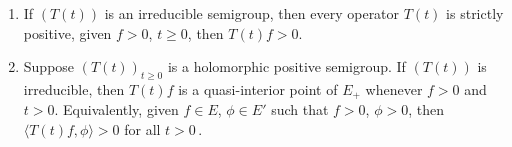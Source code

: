 \begin{theorem}\label{thm:c3-3.2}
	\begin{enumerate}[\upshape (i)]
	\item
 	If\/ $(T(t))$ is an irreducible semigroup, 
    then every operator $T(t)$ is strictly positive, \ie 
	given $f > 0$, $t \geq 0$, then $T(t)f > 0$.
	\item 
	Suppose $(T(t))_{t\geq 0}$ is a holomorphic positive semigroup.%
	If\/ $(T(t))$ is irreducible, then $T(t)f$ is a quasi-interior point%
    of\/ $E_{+}$ whenever $f > 0$ and $t > 0$.
	Equivalently, given $f \in E$, $\phi \in E'$ such that $f > 0$, $\phi > 0$, then $\langle T(t)f,\phi \rangle > 0$ for all $t > 0$\,.
	\end{enumerate}
\end{theorem}
